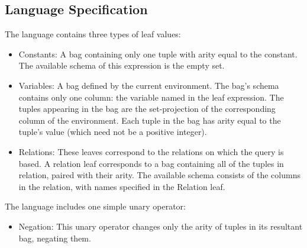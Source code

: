 \documentclass[11pt]{amsart}
\begin{document}
\subsection{Language Specification}
The language contains three types of leaf values: 
\begin{itemize}
\item Constants: A bag containing only one tuple with arity equal to the constant.  The available schema of this expression is the empty set.  

\item Variables: A bag defined by the current environment.  The bag's schema contains only one column: the variable named in the leaf expression.  The tuples appearing in the bag are the set-projection of the corresponding column of the environment.  Each tuple in the bag has arity equal to the tuple's value (which need not be a positive integer).  

\item Relations: These leaves correspond to the relations on which the query is based.  A relation leaf corresponds to a bag containing all of the tuples in relation, paired with their arity.  The available schema consists of the columns in the relation, with names specified in the Relation leaf. 
\end{itemize}

The language includes one simple unary operator:
\begin{itemize}
\item Negation: This unary operator changes only the arity of tuples in its resultant bag, negating them.
\end{itemize}
\end{document}
